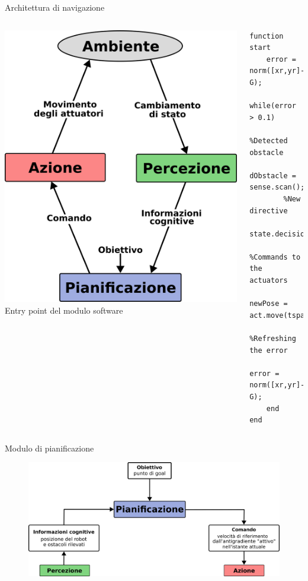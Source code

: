\documentclass[handout]{beamer}
\begin{document}
\begin{frame}[fragile]{Architettura di navigazione}
\begin{columns}
\centering
\includegraphics{architecture.png}
\centering
Entry point del modulo software \\
\begin{lstlisting}
function start
	error = norm([xr,yr]-G);
	while(error > 0.1)
		%Detected obstacle 
		dObstacle = sense.scan();
		%New directive
		state.decision(dObstacle);
		%Commands to the actuators 
		newPose = act.move(tspan);
		%Refreshing the error
		error = norm([xr,yr]-G);
	end
end
\end{lstlisting}
\end{columns}
\end{frame}


\begin{frame}{Modulo di pianificazione}
\centering
\begin{figure}
\includegraphics[scale=1]{pianificazione.png}
\end{figure}
\end{frame}
\end{document}
